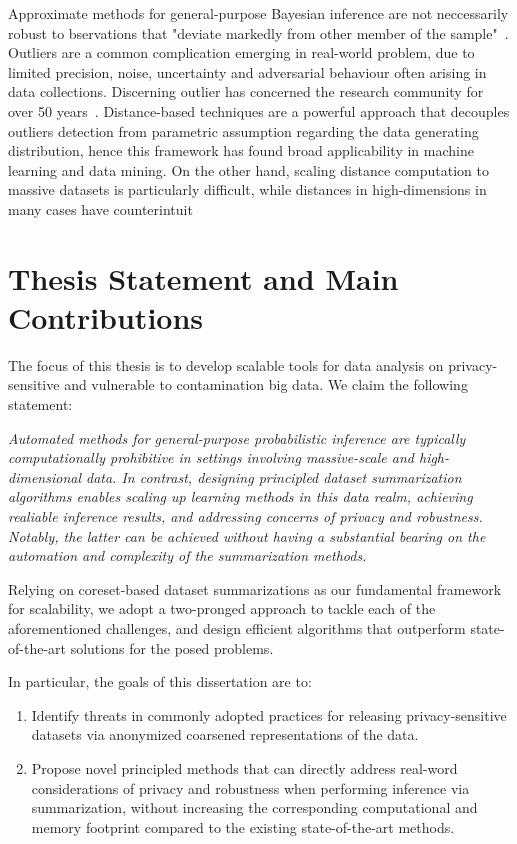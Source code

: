  Approximate methods for general-purpose Bayesian inference are not neccessarily robust to bservations that "deviate markedly from other member of the sample"~\citep{grubbs69}. Outliers are a common complication emerging in real-world problem, due to limited precision, noise, uncertainty and adversarial behaviour often arising in data collections. Discerning outlier has concerned the research community for over 50 years~\citep{definetti61}. Distance-based techniques are a powerful approach that decouples outliers detection from parametric assumption regarding the data generating distribution, hence this framework has found broad applicability in machine learning and data mining. On the other hand, scaling distance computation to massive datasets is particularly difficult, while distances in high-dimensions in many cases have counterintuit

\section{Thesis Statement and Main Contributions}
\label{sec:thesis-goals}

The focus of this thesis is to develop scalable tools for data analysis on privacy-sensitive and vulnerable to contamination big data. We claim the following statement:

\emph{Automated methods for general-purpose probabilistic inference are typically computationally prohibitive in settings involving massive-scale and high-dimensional data. In contrast, designing principled dataset summarization algorithms enables scaling up learning methods in this data realm, achieving realiable inference results, and addressing concerns of privacy and robustness. Notably, the latter can be achieved without having a substantial bearing on the automation and complexity of the summarization methods.}

Relying on coreset-based dataset summarizations as our fundamental framework for scalability, we adopt a two-pronged approach to tackle each of the aforementioned challenges, and design efficient algorithms that outperform state-of-the-art solutions for the posed problems. 


In particular, the goals of this dissertation are to:

\begin{enumerate}
	\item Identify threats in commonly adopted practices for releasing privacy-sensitive datasets via anonymized coarsened representations of the data.
	\item Propose novel principled methods that can directly address real-word considerations of privacy and robustness when performing inference via summarization, without increasing the corresponding computational and memory footprint compared to the existing state-of-the-art methods.
\end{enumerate}

